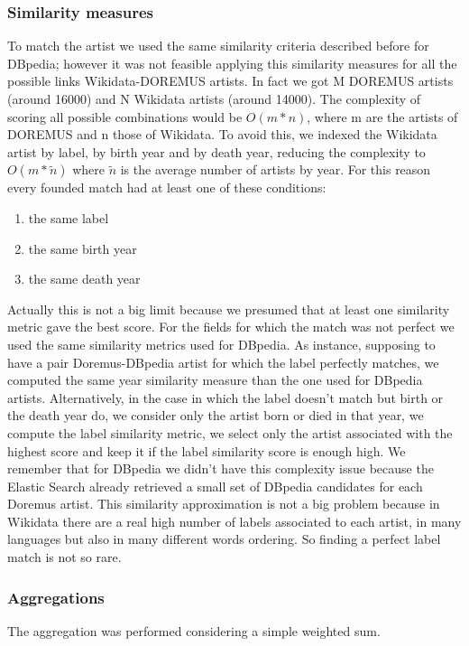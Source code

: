 \documentclass[paper=a4, fontsize=11pt]{scrartcl}
\begin{document}
\subsubsection{Similarity measures}
To match the artist we used the same similarity criteria described before for DBpedia; however it was not feasible applying this similarity measures for all the possible links Wikidata-DOREMUS artists. In fact we got M DOREMUS artists (around 16000)  and N Wikidata artists (around 14000). The complexity of scoring all possible combinations would be $O(m*n)$, where m are the artists of DOREMUS and n those of Wikidata. To avoid this, we indexed the Wikidata artist by label, by birth year and by death year, reducing the complexity to $O(m*\tilde{n})$ where $\tilde{n}$ is the average number of artists by year.
For this reason every founded match had at least one of these conditions:
\begin{enumerate}
\item the same label
\item the same birth year
\item the same death year
\end{enumerate}
Actually this is not a big limit because we presumed that at least one similarity metric gave the best score.
For the fields for which the match was not perfect we used the same similarity metrics used for DBpedia.
As instance, supposing to have a pair Doremus-DBpedia artist for which the label perfectly matches, we computed the same year similarity measure than the one used for DBpedia artists. Alternatively, in the case in which the label doesn't match but birth or the death year do, we consider only the artist born or died in that year, we compute the label similarity metric, we select only the artist associated with the highest score and keep it if the label similarity score is enough high.
We remember that for DBpedia we didn't have this complexity issue because the Elastic Search already retrieved a small set of DBpedia candidates for each Doremus artist.
This similarity approximation is not a big problem because in Wikidata there are a real high number of labels associated to each artist, in many languages but also in many different words ordering. So finding a perfect label match is not so rare.

\subsubsection{Aggregations}
The aggregation was performed considering a simple weighted sum.
\end{document}
